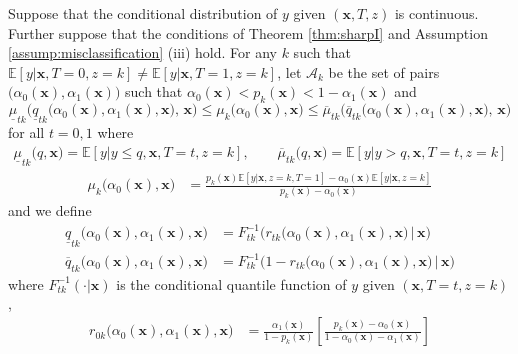 \begin{thm}
  \label{thm:sharpII}
  Suppose that the conditional distribution of $y$ given $(\mathbf{x}, T,z)$ is continuous.
  Further suppose that the conditions of Theorem \ref{thm:sharpI} and Assumption \ref{assump:misclassification} (iii) hold.
  For any $k$ such that $\mathbb{E}\left[ y|\mathbf{x},T=0,z=k \right] \neq \mathbb{E}\left[ y|\mathbf{x},T=1,z=k \right]$, let $\mathcal{A}_k$ be the set of pairs $\big(\alpha_0(\mathbf{x}), \alpha_1(\mathbf{x}) \big)$ such that  $\alpha_0(\mathbf{x}) < p_k(\mathbf{x}) < 1 -  \alpha_1(\mathbf{x})$ and
\[
  \underline{\mu}_{tk}\bigg( \underline{q}_{tk}\big( \alpha_0(\mathbf{x}), \alpha_1(\mathbf{x}), \mathbf{x}\big) , \,\mathbf{x} \bigg)\leq 
  \mu_{k}\big( \alpha_0(\mathbf{x}),\mathbf{x} \big)\leq 
  \overline{\mu}_{tk}\bigg(\overline{q}_{tk}\big( \alpha_0(\mathbf{x}), \alpha_1(\mathbf{x}), \mathbf{x}\big), \,\mathbf{x} \bigg)
\]
for all $t = 0,1$ where
\begin{align*}
  \underline{\mu}_{tk}\big( q,\mathbf{x} \big) = \mathbb{E}\left[ y\left|\right.y\leq q, \mathbf{x},T=t, z=k\right], \quad \quad
  \overline{\mu}_{tk}\big(q,\mathbf{x} \big) = \mathbb{E}\left[ y\left|\right. y > q, \mathbf{x}, T=t, z=k\right]
\end{align*}
  \begin{align*}
  \mu_k\big(\alpha_0(\mathbf{x}),\mathbf{x}\big) &= 
  \frac{p_k(\mathbf{x}) \mathbb{E}[y|\mathbf{x},z=k,T=1] - \alpha_0(\mathbf{x}) \mathbb{E}[y|\mathbf{x},z=k]}{p_k(\mathbf{x}) - \alpha_0(\mathbf{x})}
\end{align*}
and we define 
\begin{align*}
  \underline{q}_{tk}\big(\alpha_0(\mathbf{x}),\alpha_1(\mathbf{x}),\mathbf{x}\big) &= F^{-1}_{tk}\bigg(r_{tk}\big(\alpha_0(\mathbf{x}),\alpha_1(\mathbf{x}), \mathbf{x}\big)\, \bigg|\,\mathbf{x}\bigg)\\
  \overline{q}_{tk}\big(\alpha_0(\mathbf{x}),\alpha_1(\mathbf{x}),\mathbf{x}\big) &= F^{-1}_{tk}\bigg(1 - r_{tk}\big(\alpha_0(\mathbf{x}), \alpha_1(\mathbf{x}),\mathbf{x}\big) \,\bigg|\,\mathbf{x}\bigg)
\end{align*}
where $F_{tk}^{-1}(\cdot|\mathbf{x})$ is the conditional quantile function of $y$ given $(\mathbf{x},T=t,z=k)$,  
\begin{align*}
  r_{0k}\big(\alpha_0(\mathbf{x}),\alpha_1(\mathbf{x}),\mathbf{x}\big) &= \frac{\alpha_1(\mathbf{x})}{1 - p_k(\mathbf{x})} \left[ \frac{p_k(\mathbf{x}) - \alpha_0(\mathbf{x})}{1 - \alpha_0(\mathbf{x}) - \alpha_1(\mathbf{x})} \right]\\

\end{align*}
\end{thm}
